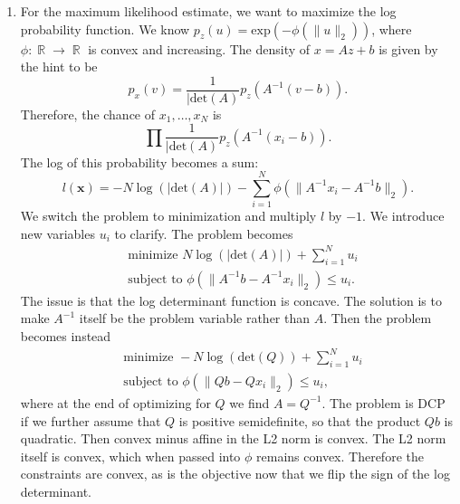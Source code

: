 \documentclass{article}
\DeclareMathOperator{\R}{\mathbb{R}}
\begin{document}
\begin{enumerate}
\item For the maximum likelihood estimate, we want to maximize the log probability function. We know $p_z(u) = \text{exp}(-\phi(\|u\|_2))$, where $\phi : \R \to \R$ is convex and increasing. The density of $x = Az + b$ is given by the hint to be \[
        p_x(v) = \frac{1}{|\text{det}(A)} p_z(A^{-1}(v - b)).
    \] Therefore, the chance of $x_1, \dots, x_N$ is \[
        \prod \frac{1}{|\text{det}(A)} p_z(A^{-1}(x_i - b)).
    \] The log of this probability becomes a sum: \[
        l(\mathbf{x}) = -N \log(|\text{det}(A)|) - \sum_{i=1}^N \phi(\|A^{-1}x_i - A^{-1} b\|_2).
    \] We switch the problem to minimization and multiply $l$ by $-1$. We introduce new variables $u_i$ to clarify. The problem becomes \begin{align*}
        &\text{minimize } N\log(|\text{det}(A)|) + \sum_{i=1}^N u_i \\
        &\text{subject to } \phi(\|A^{-1} b - A^{-1} x_i \|_2) \leq u_i.
    \end{align*} The issue is that the log determinant function is concave. The solution is to make $A^{-1}$ itself be the problem variable rather than $A$. Then the problem becomes instead \begin{align*}
        &\text{minimize } -N\log(\text{det}(Q)) + \sum_{i=1}^N u_i \\
        &\text{subject to } \phi(\|Q b - Q x_i \|_2) \leq u_i,
    \end{align*} where at the end of optimizing for $Q$ we find $A = Q^{-1}$. The problem is DCP if we further assume that $Q$ is positive semidefinite, so that the product $Qb$ is quadratic. Then convex minus affine in the L2 norm is convex. The L2 norm itself is convex, which when passed into $\phi$ remains convex. Therefore the constraints are convex, as is the objective now that we flip the sign of the log determinant.

\end{enumerate}
\end{document}
